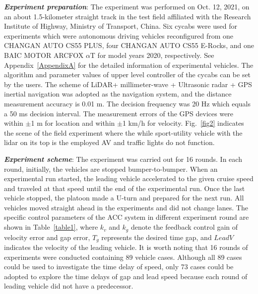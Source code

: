 \documentclass[a4paper]{cas-sc}
\begin{document}
\textbf{\emph{Experiment preparation}}: The experiment was performed on Oct. 12, 2021, on an about 1.5-kilometer straight track in the test field affiliated with the Research Institute of Highway, Ministry of Transport, China. Six cycabs were used for experiments which were autonomous driving vehicles reconfigured from one CHANGAN AUTO CS55 PLUS, four CHANGAN AUTO CS55 E-Rocks, and one BAIC MOTOR ARCFOX $\alpha$T for model years 2020, respectively. See Appendix~\ref{AppendixA} for the detailed information of experimental vehicles. The algorithm and parameter values of upper level controller of the cycabs can be set by the users. The scheme of LiDAR+ millimeter-wave + Ultrasonic radar + GPS inertial navigation was adopted as the navigation system, and the distance measurement accuracy is 0.01 m. The decision frequency was 20 Hz which equals a 50 ms decision interval. The measurement errors of the GPS devices were within $\pm$1 m for location and within $\pm$1 km/h for velocity. Fig.~\ref{fig2} indicates the scene of the field experiment where the while sport-utility vehicle with the lidar on its top is the employed AV and traffic lights do not function.

\textbf{\emph{Experiment scheme}}: The experiment was carried out for 16 rounds. In each round, initially, the vehicles are stopped bumper-to-bumper. When an experimental run started, the leading vehicle accelerated to the given cruise speed and traveled at that speed until the end of the experimental run. Once the last vehicle stopped, the platoon made a U-turn and prepared for the next run. All vehicles moved straight ahead in the experiments and did not change lanes. The specific control parameters of the ACC system in different experiment round are shown in Table~\ref{table1}, where $k_{v}$ and $k_{g}$ denote the feedback control gain of velocity error and gap error, $T_{g}$ represents the desired time gap, and $LeadV$ indicates the velocity of the leading vehicle. It is worth noting that 16 rounds of experiments were conducted containing 89 vehicle cases. Although all 89 cases could be used to investigate the time delay of speed, only 73 cases could be adopted to explore the time delays of gap and lead speed because each round of leading vehicle did not have a predecessor.
\end{document}
